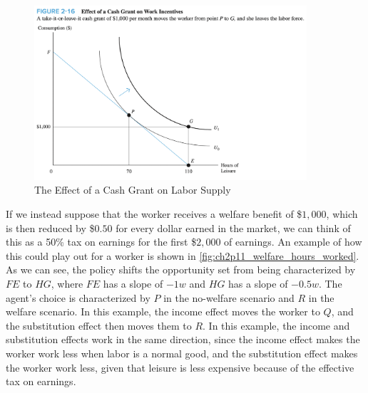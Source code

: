 \FloatBarrier

\begin{figure}[!htb]
    \centering
        \includegraphics[width=0.9\textwidth]{../input/ch_2p11_cash_grant.png}
    \caption{The Effect of a Cash Grant on Labor Supply}
    \label{fig:ch2p11_cash_grant}
\end{figure}

\FloatBarrier

If we instead suppose that the worker receives 
a welfare benefit of \$$1,000$, which is then reduced 
by \$$0.50$ for every dollar earned in the market,
we can think of this as a 50\% tax on earnings for the first
\$$2,000$ of earnings.
An example of how this could play out for a worker 
is shown in \autoref{fig:ch2p11_welfare_hours_worked}.
As we can see, the policy shifts the opportunity set
from being characterized by $FE$ to $HG$, where 
$FE$ has a slope of $-1w$ and
$HG$ has a slope of $-0.5w$. The agent's choice is 
characterized by $P$ in the no-welfare scenario
and $R$ in the welfare scenario.
In this example, the income effect moves the worker
to $Q$, and the substitution effect then moves them to $R$.
In this example, the income and substitution effects work 
in the same direction, since the income effect makes the 
worker work less when labor is a normal good, and the 
substitution effect makes the worker work less, given that 
leisure is less expensive because of the effective tax on earnings.

\FloatBarrier

